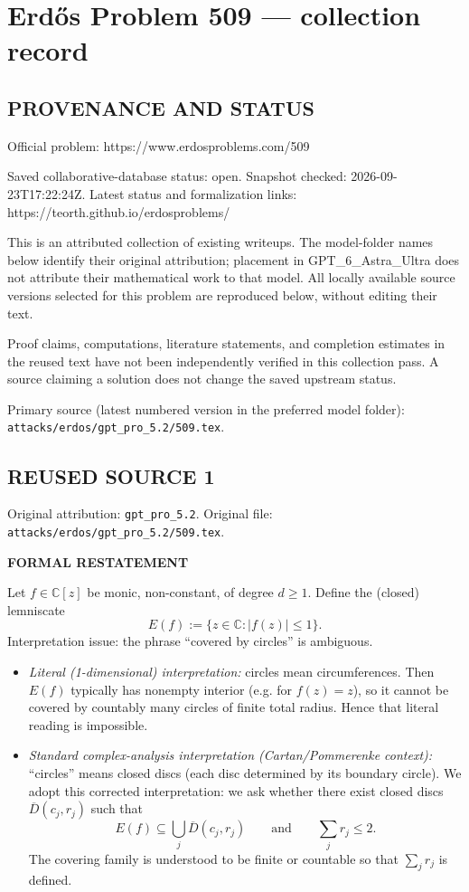 \section*{Erd\H{o}s Problem 509 --- collection record}

\subsection*{PROVENANCE AND STATUS}
Official problem: https://www.erdosproblems.com/509

Saved collaborative-database status: open.
Snapshot checked: 2026-09-23T17:22:24Z.
Latest status and formalization links: https://teorth.github.io/erdosproblems/

This is an attributed collection of existing writeups. The model-folder names below identify their original attribution; placement in GPT\_6\_Astra\_Ultra does not attribute their mathematical work to that model. All locally available source versions selected for this problem are reproduced below, without editing their text.

Proof claims, computations, literature statements, and completion estimates in the reused text have not been independently verified in this collection pass. A source claiming a solution does not change the saved upstream status.

Primary source (latest numbered version in the preferred model folder): \texttt{attacks/erdos/gpt\_pro\_5.2/509.tex}.

\subsection*{REUSED SOURCE 1}
Original attribution: \texttt{gpt\_pro\_5.2}.
Original file: \texttt{attacks/erdos/gpt\_pro\_5.2/509.tex}.


\noindent\textbf{FORMAL RESTATEMENT}

Let $f\in\mathbb{C}[z]$ be monic, non-constant, of degree $d\ge 1$. Define the (closed) lemniscate
\[
E(f):=\{z\in\mathbb{C}: |f(z)|\le 1\}.
\]
Interpretation issue: the phrase ``covered by circles'' is ambiguous.

\begin{itemize}
\item \emph{Literal (1-dimensional) interpretation:} circles mean circumferences. Then $E(f)$ typically has nonempty interior (e.g. for $f(z)=z$), so it cannot be covered by countably many circles of finite total radius. Hence that literal reading is impossible.
\item \emph{Standard complex-analysis interpretation (Cartan/Pommerenke context):} ``circles'' means closed discs (each disc determined by its boundary circle). We adopt this corrected interpretation: we ask whether there exist closed discs $\overline{D}(c_j,r_j)$ such that
\[
E(f)\subseteq \bigcup_j \overline{D}(c_j,r_j)
\qquad\text{and}\qquad \sum_j r_j\le 2.
\]
The covering family is understood to be finite or countable so that $\sum_j r_j$ is defined.
\end{itemize}

